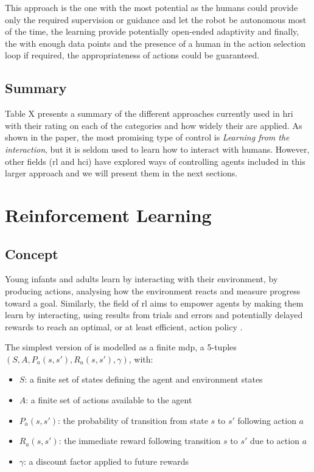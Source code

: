 	This approach is the one with the most potential as the humans could provide only the required supervision or guidance and let the robot be autonomous most of the time, the learning provide potentially open-ended adaptivity and finally, the with enough data points and the presence of a human in the action selection loop if required, the appropriateness of actions could be guaranteed.

\subsection{Summary}

	Table X presents a summary of the different approaches currently used in \gls{hri} with their rating on each of the categories and how widely their are applied. As shown in the paper, the most promising type of control is \textit{Learning from the interaction}, but it is seldom used to learn how to interact with humans. However, other fields (\acrlong{rl} and \gls{hci}) have explored ways of controlling agents included in this larger approach and we will present them in the next sections.

\section{Reinforcement Learning} 	
\subsection{Concept}
	Young infants and adults learn by interacting with their environment, by producing actions, analysing how the environment reacts and measure progress toward a goal. Similarly, the field of \acrfull{rl} aims to empower agents by making them learn by interacting, using results from trials and errors and potentially delayed rewards to reach an optimal, or at least efficient, action policy \cite{sutton1998reinforcement}.

	The simplest version of  is modelled as a finite \acrfull{mdp}, a 5-tuples $(S, A, P_a(s,s'), R_a(s,s'), \gamma)$, with:
	\begin{itemize}
		\item $S$: a finite set of states defining the agent and environment states
		\item $A$: a finite set of actions available to the agent
		\item $P_a(s,s')$: the probability of transition from state $s$ to $s'$ following action $a$
		\item $R_a(s,s')$: the immediate reward following transition $s$ to $s'$ due to action $a$
		\item $\gamma$: a discount factor applied to future rewards
	\end{itemize}

